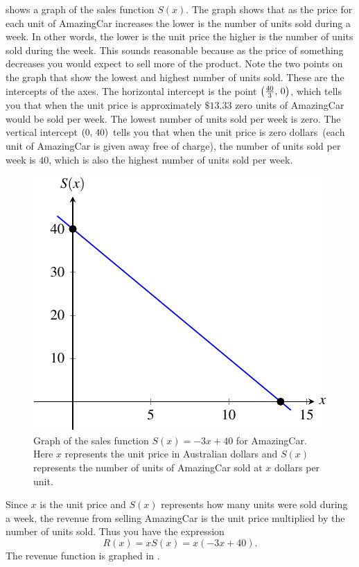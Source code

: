 \documentclass[a4paper,oneside,12pt]{article}
\begin{document}
\begin{solution}
 shows a graph of the sales
function $S(x)$.  The graph shows that as the price for each unit of
AmazingCar increases the lower is the number of units sold during a
week.  In other words, the lower is the unit price the higher is the
number of units sold during the week.  This sounds reasonable because
as the price of something decreases you would expect to sell more of
the product.  Note the two points on the graph that show the lowest
and highest number of units sold.  These are the intercepts of the
axes.  The horizontal intercept is the point
$\left\lparen{\frac{40}{3}},\, {0}\right\rparen$, which tells you that when the unit price is
approximately $\$13.33$ zero units of AmazingCar would be sold per
week.  The lowest number of units sold per week is zero.  The vertical
intercept $\left\lparen{0},\, {40}\right\rparen$ tells you that when the unit price is zero
dollars~(each unit of AmazingCar is given away free of charge), the
number of units sold per week is $40$, which is also the highest
number of units sold per week.

\begin{figure}[!htbp]
\centering
\includegraphics[scale=1.1]{image/10/amazingcar-sales.pdf}
\caption{%
  Graph of the sales function $S(x) = -3x + 40$ for AmazingCar.  Here
  $x$ represents the unit price in Australian dollars and $S(x)$
  represents the number of units of AmazingCar sold at $x$ dollars
  per unit.
}
\label{fig:quadroots:AmazingCar_sales}
\end{figure}

Since $x$ is the unit price and $S(x)$ represents how many units were
sold during a week, the revenue from selling AmazingCar is the unit
price multiplied by the number of units sold.  Thus you have the
expression
\[
R(x)
=
x S(x)
=
x(-3x + 40).
\]
The revenue function is graphed in
.


\end{solution}
\end{document}
